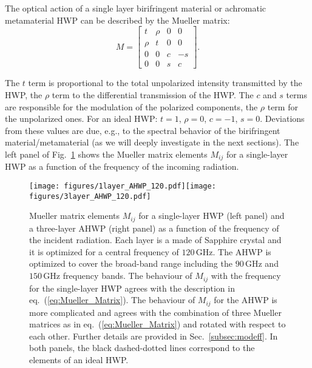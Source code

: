 The optical action of a single layer birifringent material or achromatic metamaterial HWP can be described by the Mueller matrix:
\begin{equation}
M=\begin{bmatrix}
   t  &\rho  &0  &0\\
   \rho  &t  &0  &0\\
   0  &0  &c  &-s\\
   0  &0  &s  &c
\end{bmatrix}.
\label{eq:Mueller_Matrix}
\end{equation}

The $t$ term is proportional to the total unpolarized intensity transmitted by the HWP, the $\rho$ term to the differential transmission of the HWP. The $c$ and $s$ terms are responsible for the modulation of the polarized components, the $\rho$ term for the unpolarized ones. For an ideal HWP: $t=1$, $\rho=0$, $c=-1$, $s=0$. Deviations from these values are due, e.g., to the spectral behavior of the birifringent material/metamaterial (as we will deeply investigate in the next sections). The left panel of Fig.~\ref{fig:Mueller_elements} shows the Mueller matrix elements $M_{ij}$ for a single-layer HWP as a function of the frequency of the incoming radiation. 

\begin{figure}
\begin{center}
\texttt{[image: figures/1layer\_AHWP\_120.pdf]}\texttt{[image: figures/3layer\_AHWP\_120.pdf]}
\end{center}
\caption{Mueller matrix elements $M_{ij}$ for a single-layer HWP (left panel) and a three-layer AHWP (right panel) as a function of the frequency of the incident radiation. Each layer is a made of Sapphire crystal and it is optimized for a central frequency of $120\,\mathrm{GHz}$. The AHWP is optimized to cover the broad-band range including the $90\,\mathrm{GHz}$ and $150\,\mathrm{GHz}$ frequency bands. The behaviour of $M_{ij}$ with the frequency for the single-layer HWP agrees with the description in eq.~(\ref{eq:Mueller_Matrix}). The behaviour of $M_{ij}$ for the AHWP is more complicated and agrees with the combination of three Mueller matrices as in eq.~(\ref{eq:Mueller_Matrix}) and rotated with respect to each other. Further details are provided in Sec.~\ref{subsec:modeff}. In both panels, the black dashed-dotted lines correspond to the elements of an ideal HWP.}\label{fig:Mueller_elements}
\end{figure}


